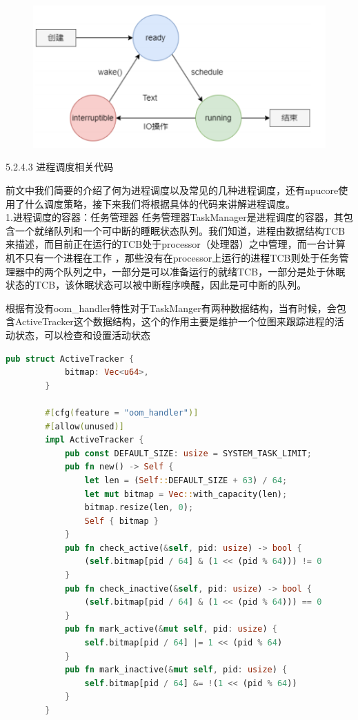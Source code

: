 \begin{figure}[H]
    \centering
    \includegraphics{figures/05-02-04进程状态.png}
\end{figure}


5.2.4.3 进程调度相关代码

前文中我们简要的介绍了何为进程调度以及常见的几种进程调度，还有npucore使用了什么调度策略，接下来我们将根据具体的代码来讲解进程调度。
\\[5pt]

1.进程调度的容器：任务管理器
任务管理器TaskManager是进程调度的容器，其包含一个就绪队列和一个可中断的睡眠状态队列。我们知道，进程由数据结构TCB来描述，而目前正在运行的TCB处于processor（处理器）之中管理，而一台计算机不只有一个进程在工作 ，那些没有在processor上运行的进程TCB则处于任务管理器中的两个队列之中，一部分是可以准备运行的就绪TCB，一部分是处于休眠状态的TCB，该休眠状态可以被中断程序唤醒，因此是可中断的队列。

根据有没有oom_handler特性对于TaskManger有两种数据结构，当有时候，会包含ActiveTracker这个数据结构，这个的作用主要是维护一个位图来跟踪进程的活动状态，可以检查和设置活动状态
\begin{lstlisting}[language=rust]
    pub struct ActiveTracker {
            bitmap: Vec<u64>,
        }
        
        #[cfg(feature = "oom_handler")]
        #[allow(unused)]
        impl ActiveTracker {
            pub const DEFAULT_SIZE: usize = SYSTEM_TASK_LIMIT;
            pub fn new() -> Self {
                let len = (Self::DEFAULT_SIZE + 63) / 64;
                let mut bitmap = Vec::with_capacity(len);
                bitmap.resize(len, 0);
                Self { bitmap }
            }
            pub fn check_active(&self, pid: usize) -> bool {
                (self.bitmap[pid / 64] & (1 << (pid % 64))) != 0
            }
            pub fn check_inactive(&self, pid: usize) -> bool {
                (self.bitmap[pid / 64] & (1 << (pid % 64))) == 0
            }
            pub fn mark_active(&mut self, pid: usize) {
                self.bitmap[pid / 64] |= 1 << (pid % 64)
            }
            pub fn mark_inactive(&mut self, pid: usize) {
                self.bitmap[pid / 64] &= !(1 << (pid % 64))
            }
        } 
\end{lstlisting}

